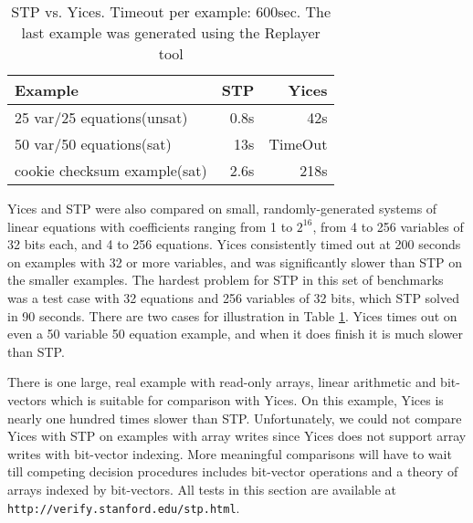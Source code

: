 \begin{table}[t]
\footnotesize
\begin{center}
\begin{tabular}{|l|r|r|}
\hline
{\bf Example} & {\bf STP} & {\bf Yices} \\
\hline
25 var/25 equations(unsat) &  0.8s  & 42s  \\
50 var/50 equations(sat)   &  13s  &  TimeOut \\
cookie checksum example(sat) &  2.6s &  218s \\
\hline
\end{tabular}
\end{center}
\caption{STP vs. Yices. Timeout per example: 600sec. The last example
was generated using the Replayer tool}
\label{STP-Yices-table}
\end{table}

Yices and STP were also compared on small, randomly-generated systems
of linear equations with coefficients ranging from 1 to $2^{16}$, from
4 to 256 variables of 32 bits each, and 4 to 256 equations.  Yices
consistently timed out at 200 seconds on examples with 32 or more
variables, and was significantly slower than STP on the smaller
examples. The hardest problem for STP in this set of benchmarks was a
test case with 32 equations and 256 variables of 32 bits, which STP
solved in 90 seconds. There are two cases for illustration in Table
\ref{STP-Yices-table}. Yices times out on even a 50 variable 50
equation example, and when it does finish it is much slower than STP.

There is one large, real example with read-only arrays, linear
arithmetic and bit-vectors which is suitable for comparison with
Yices.  On this example, Yices is nearly one hundred times slower than
STP. Unfortunately, we could not compare Yices with STP on examples
with array writes since Yices does not support array writes with
bit-vector indexing.  More meaningful comparisons will have to wait
till competing decision procedures includes bit-vector operations and
a theory of arrays indexed by bit-vectors. All tests in this section
are available at \\ \verb|http://verify.stanford.edu/stp.html|.

